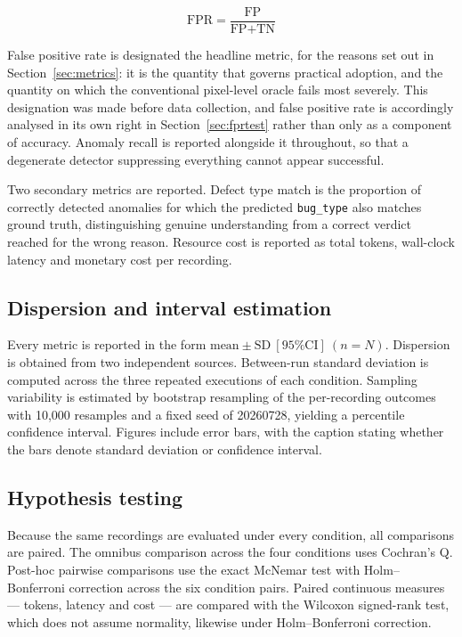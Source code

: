 \begin{equation}
  \text{FPR} = \frac{\text{FP}}{\text{FP} + \text{TN}}
\end{equation}

False positive rate is designated the headline metric, for the reasons set
out in Section~\ref{sec:metrics}: it is the quantity that governs
practical adoption, and the quantity on which the conventional pixel-level
oracle fails most severely. This designation was made before data
collection, and false positive rate is accordingly analysed in its own
right in Section~\ref{sec:fprtest} rather than only as a component of
accuracy. Anomaly recall is reported alongside it throughout, so that a
degenerate detector suppressing everything cannot appear successful.

Two secondary metrics are reported. Defect type match is the proportion of
correctly detected anomalies for which the predicted \texttt{bug\_type}
also matches ground truth, distinguishing genuine understanding from a
correct verdict reached for the wrong reason. Resource cost is reported as
total tokens, wall-clock latency and monetary cost per recording.

\subsection{Dispersion and interval estimation}

Every metric is reported in the form
$\text{mean} \pm \text{SD}\ [\text{95\% CI}]\ (n = N)$. Dispersion is
obtained from two independent sources. Between-run standard deviation is
computed across the three repeated executions of each condition. Sampling
variability is estimated by bootstrap resampling of the per-recording
outcomes with 10{,}000 resamples and a fixed seed of 20260728, yielding a
percentile confidence interval. Figures include error bars, with the
caption stating whether the bars denote standard deviation or confidence
interval.

\subsection{Hypothesis testing}

Because the same recordings are evaluated under every condition, all
comparisons are paired. The omnibus comparison across the four conditions
uses Cochran's Q. Post-hoc pairwise comparisons use the exact McNemar test
with Holm--Bonferroni correction across the six condition pairs. Paired
continuous measures --- tokens, latency and cost --- are compared with the
Wilcoxon signed-rank test, which does not assume normality, likewise under
Holm--Bonferroni correction.

